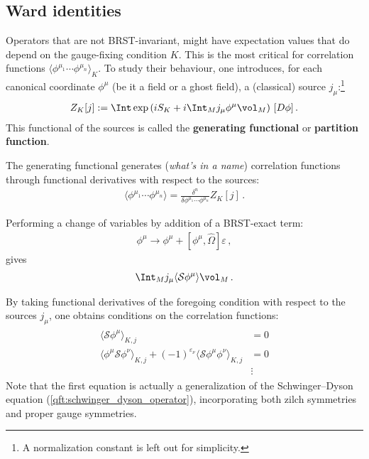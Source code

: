 \subsection{Ward identities}

    Operators that are not BRST-invariant, might have expectation values that do depend on the gauge-fixing condition $K$. This is the most critical for correlation functions $\langle\phi^{\mu_1}\cdots\phi^{\mu_n}\rangle_K$. To study their behaviour, one introduces, for each canonical coordinate $\phi^\mu$ (be it a field or a ghost field), a (classical) source $j_\mu$:\footnote{A normalization constant is left out for simplicity.}
    \begin{gather}
        \label{qft:partition_function}
        Z_K[j] := \Int\exp\left(iS_K + i\Int_Mj_\mu \phi^\mu\vol_M\right)\,[D\phi]\,.
    \end{gather}
    This functional of the sources is called the \textbf{generating functional} or \textbf{partition function}.
    
    \begin{property}\label{qft:diagram_generation}
        The generating functional generates (\textit{what's in a name}) correlation functions through functional derivatives with respect to the sources:
        \begin{gather}
            \langle\phi^{\mu_1}\cdots\phi^{\mu_n}\rangle = \frac{\delta^n}{\delta\phi^{\mu_1}\cdots\phi^{\mu_n}}Z_K[j]\,.
        \end{gather}
    \end{property}

    Performing a change of variables by addition of a BRST-exact term:
    \begin{gather}
        \phi^\mu \longrightarrow \phi^\mu+[\phi^\mu,\widehat{\Omega}]\varepsilon\,,
    \end{gather}
    gives
    \begin{gather}
        \label{qft:pre_ward_equation}
        \Int_Mj_\mu\langle\mathcal{S}\phi^\mu\rangle\vol_M\,.
    \end{gather}
    \begin{property}
        By taking functional derivatives of the foregoing condition with respect to the sources $j_\mu$, one obtains conditions on the correlation functions:
        \begin{gather}
            \begin{aligned}
                \langle\mathcal{S}\phi^\mu\rangle_{K,j} &= 0\\
                \langle\phi^\mu\mathcal{S}\phi^\nu\rangle_{K,j} + (-1)^{\varepsilon_\nu}\langle\mathcal{S}\phi^\mu\phi^\nu\rangle_{K,j} &= 0\\
                &\vdots
            \end{aligned}
        \end{gather}
        Note that the first equation is actually a generalization of the Schwinger--Dyson equation (\cref{qft:schwinger_dyson_operator}), incorporating both zilch symmetries and proper gauge symmetries.
    \end{property}

